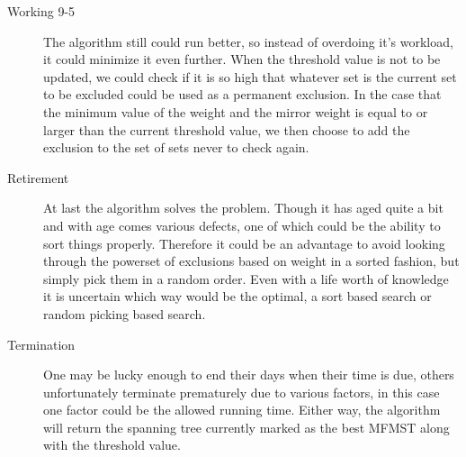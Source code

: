 \documentclass[12pt]{report}
\begin{document}
\begin{description}
	\item[Working 9-5] The algorithm still could run better, so instead of overdoing it's workload, it could minimize it even further. When the threshold value is not to be updated, we could check if it is so high that whatever set is the current set to be excluded could be used as a permanent exclusion. In the case that the minimum value of the weight and the mirror weight is equal to or larger than the current threshold value, we then choose to add the exclusion to the set of sets never to check again.
	
	\item[Retirement] At last the algorithm solves the problem. Though it has aged quite a bit and with age comes various defects, one of which could be the ability to sort things properly. Therefore it could be an advantage to avoid looking through the powerset of exclusions based on weight in a sorted fashion, but simply pick them in a random order. Even with a life worth of knowledge it is uncertain which way would be the optimal, a sort based search or random picking based search.
	
	\item[Termination] One may be lucky enough to end their days when their time is due, others unfortunately terminate prematurely due to various factors, in this case one factor could be the allowed running time. Either way, the algorithm will return the spanning tree currently marked as the best MFMST along with the threshold value.
\end{description}
\end{document}
